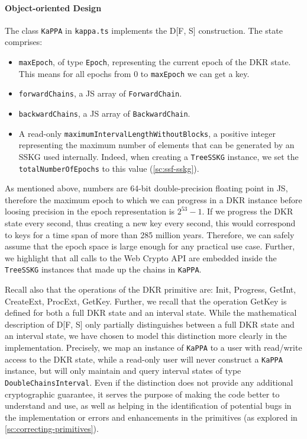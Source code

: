 \paragraph{Object-oriented Design}
The class \texttt{KaPPA} in {\texttt{kappa.ts}} implements the
D[F, S] construction. The state comprises:
\begin{itemize}
    \item \texttt{maxEpoch}, of type \texttt{Epoch}, representing the current epoch of the DKR state. This means for all epochs from 0 to \texttt{maxEpoch} we can get a key.
    \item \texttt{forwardChains}, a JS array of \texttt{ForwardChain}.
    \item \texttt{backwardChains}, a JS array of \texttt{BackwardChain}.
    \item A read-only \texttt{maximumIntervalLengthWithoutBlocks}, a positive integer representing the maximum number of elements that can be generated by an SSKG used internally.
    Indeed, when creating a \texttt{TreeSSKG} instance, we set the \texttt{totalNumberOfEpochs} to this value (\cref{sc:ssf-sskg}).
\end{itemize}

As mentioned above, numbers are 64-bit double-precision floating point in JS,
therefore the maximum epoch to which we can progress in a DKR instance before
loosing precision in the epoch representation is $2^{53} - 1$.
If we progress the DKR state every second, thus creating a new key
every second, this would correspond to keys for
a time span of more than 285 million years. 
Therefore, we can safely
assume that the epoch space is large enough for any practical use case.
Further, we highlight that all calls to the Web Crypto API are embedded 
inside the \texttt{TreeSSKG} instances that made up the chains in \texttt{KaPPA}. 

Recall also that the operations of the DKR primitive are:
Init, Progress, GetInt, CreateExt, ProcExt, GetKey. Further, we recall
that the operation GetKey is defined for both a full DKR state and
an interval state.
While the mathematical
description of D[F, S] only partially distinguishes between
a full DKR state and an interval state, we have chosen to model
this distinction more clearly in the implementation.
Precisely, we map an instance of \texttt{KaPPA} to a user with
read/write access to the DKR state, while a read-only
user will never construct a \texttt{KaPPA} instance, but will
only maintain and query interval states of type
\texttt{DoubleChainsInterval}. Even if the distinction does not
provide any additional cryptographic guarantee, it serves the purpose of
making the code better to understand and use, as well
as helping in the identification of potential bugs in the implementation
or errors and enhancements in the primitives (as explored in \cref{sc:correcting-primitives}).

